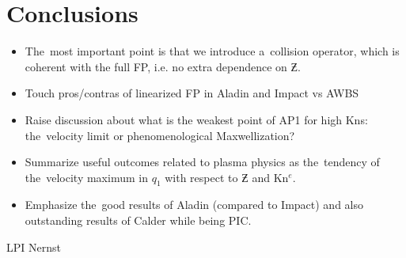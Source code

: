 \section{Conclusions}
\label{sec:Conclusions}

\begin{itemize}
  \item The~most important point is that we introduce a~collision operator, 
    which is coherent with the full FP, i.e. no extra dependence on $\Zbar$.
  \item Touch pros/contras of linearized FP in Aladin and Impact vs AWBS
  \item Raise discussion about what is the weakest point of AP1 for high Kns: 
    the~velocity limit or phenomenological Maxwellization?
  \item Summarize useful outcomes related to plasma physics as 
    the~tendency of the~velocity maximum in $q_1$ with respect to $\Zbar$ and
	Kn$^e$.
  \item Emphasize the~good results of Aladin (compared to Impact) and also
    outstanding results of Calder while being PIC. 
\end{itemize}

LPI \cite{Kirkwood_NIFLPI_PPCF2013}
Nernst \cite{Walsh_Nernst_PRL2017}

